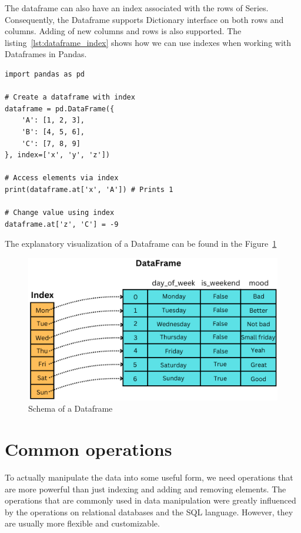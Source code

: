 The dataframe can also have an index associated with the rows of Series.
Consequently, the Dataframe supports Dictionary interface on both rows and columns.
Adding of new columns and rows is also supported.
The listing~\ref{lst:dataframe_index} shows how we can use indexes when working with Dataframes in Pandas.

\begin{lstlisting}[caption=Index on a Dataframe, label={lst:dataframe_index}, captionpos=b]
import pandas as pd

# Create a dataframe with index
dataframe = pd.DataFrame({
    'A': [1, 2, 3],
    'B': [4, 5, 6],
    'C': [7, 8, 9]
}, index=['x', 'y', 'z'])

# Access elements via index
print(dataframe.at['x', 'A']) # Prints 1

# Change value using index
dataframe.at['z', 'C'] = -9
\end{lstlisting}

The explanatory visualization of a Dataframe can be found in the Figure~\ref{fig:dataframe_schema}

\begin{figure}[H]
    \caption{Schema of a Dataframe}
    \label{fig:dataframe_schema}
    \centering
    \includegraphics[scale=0.4]{img/Dataframe}
\end{figure}


\section{Common operations} %

To actually manipulate the data into some useful form, we need operations that are more powerful than just indexing and
adding and removing elements.
The operations that are commonly used in data manipulation were greatly influenced by the operations on relational
databases and the SQL language.
However, they are usually more flexible and customizable. %

